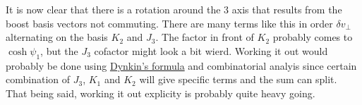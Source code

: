 \documentclass[12pt,a4]{article}
\begin{document}
        It is now clear that there is a rotation around the $3$ axis that results from the boost basis vectors not commuting.
        There are many terms like this in order $\delta v_\perp$ alternating on the basis $K_2$ and $J_3$.
        The factor in front of $K_2$ probably comes to $\cosh \psi_1$, but the $J_3$ cofactor might look a bit wierd.
        Working it out would probably be done using \href{https://en.wikipedia.org/wiki/Baker\%E2\%80\%93Campbell\%E2\%80\%93Hausdorff_formula}{Dynkin's formula} and combinatorial analyis since certain combination of $J_3$, $K_1$ and $K_2$ will give specific terms and the sum can split.
        That being said, working it out explicity is probably quite heavy going.
\end{document}
